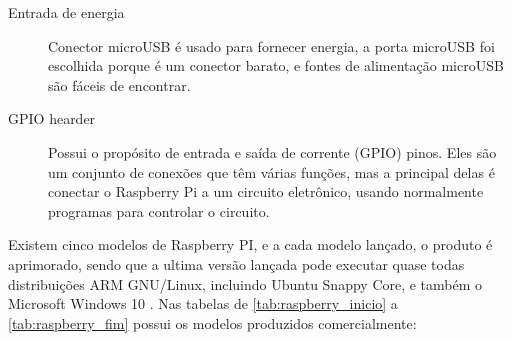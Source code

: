 \documentclass[
	12pt,				%
	openright,			%
	twoside,			%
	a4paper,			%
	chapter=TITLE,		%
	english,			%
	brazil				%
	]{abntex2}
\begin{document}
\begin{description}
\item[Entrada de energia] 
 Conector microUSB é usado para fornecer energia, a porta microUSB foi escolhida porque é um conector barato, e fontes de alimentação microUSB são fáceis de encontrar.

\item[GPIO hearder]
Possui o propósito de entrada e saída de corrente (GPIO) pinos. Eles são um conjunto de conexões que têm várias funções, mas a principal delas é conectar o Raspberry Pi a um circuito eletrônico, usando normalmente programas para controlar o circuito.


\end{description}

Existem cinco modelos de Raspberry PI, e a cada modelo lançado, o produto é aprimorado, sendo que a ultima versão lançada pode executar quase todas distribuições ARM GNU/Linux, incluindo Ubuntu Snappy Core, e também o Microsoft Windows 10 \cite{raspberrypi.org}. Nas tabelas de \ref{tab:raspberry_inicio} a \ref{tab:raspberry_fim} possui os modelos produzidos comercialmente:
\end{document}
